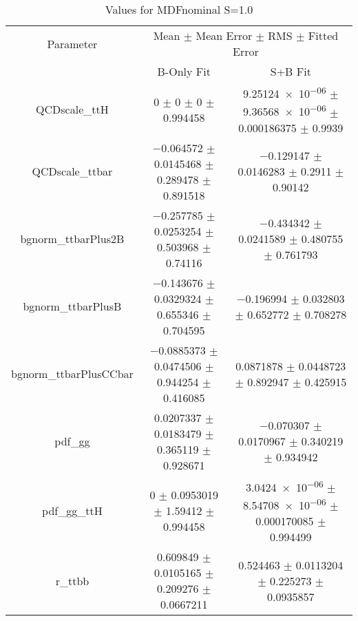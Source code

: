 \begin{table}
\centering
\caption{Values for MDFnominal S=1.0}
\begin{tabular}{ccc}
\toprule
Parameter & \multicolumn{2}{c}{Mean $\pm$ Mean Error $\pm$ RMS $\pm$ Fitted Error}\\
 & B-Only Fit & S+B Fit\\
\midrule
QCDscale\_ttH & \num{0} $\pm$ \num{0} $\pm$ \num{0} $\pm$ \num{0.994458} & \num{9.25124e-06} $\pm$ \num{9.36568e-06} $\pm$ \num{0.000186375} $\pm$ \num{0.9939}\\
QCDscale\_ttbar & \num{-0.064572} $\pm$ \num{0.0145468} $\pm$ \num{0.289478} $\pm$ \num{0.891518} & \num{-0.129147} $\pm$ \num{0.0146283} $\pm$ \num{0.2911} $\pm$ \num{0.90142}\\
bgnorm\_ttbarPlus2B & \num{-0.257785} $\pm$ \num{0.0253254} $\pm$ \num{0.503968} $\pm$ \num{0.74116} & \num{-0.434342} $\pm$ \num{0.0241589} $\pm$ \num{0.480755} $\pm$ \num{0.761793}\\
bgnorm\_ttbarPlusB & \num{-0.143676} $\pm$ \num{0.0329324} $\pm$ \num{0.655346} $\pm$ \num{0.704595} & \num{-0.196994} $\pm$ \num{0.032803} $\pm$ \num{0.652772} $\pm$ \num{0.708278}\\
bgnorm\_ttbarPlusCCbar & \num{-0.0885373} $\pm$ \num{0.0474506} $\pm$ \num{0.944254} $\pm$ \num{0.416085} & \num{0.0871878} $\pm$ \num{0.0448723} $\pm$ \num{0.892947} $\pm$ \num{0.425915}\\
pdf\_gg & \num{0.0207337} $\pm$ \num{0.0183479} $\pm$ \num{0.365119} $\pm$ \num{0.928671} & \num{-0.070307} $\pm$ \num{0.0170967} $\pm$ \num{0.340219} $\pm$ \num{0.934942}\\
pdf\_gg\_ttH & \num{0} $\pm$ \num{0.0953019} $\pm$ \num{1.59412} $\pm$ \num{0.994458} & \num{3.0424e-06} $\pm$ \num{8.54708e-06} $\pm$ \num{0.000170085} $\pm$ \num{0.994499}\\
r\_ttbb & \num{0.609849} $\pm$ \num{0.0105165} $\pm$ \num{0.209276} $\pm$ \num{0.0667211} & \num{0.524463} $\pm$ \num{0.0113204} $\pm$ \num{0.225273} $\pm$ \num{0.0935857}\\
\bottomrule
\end{tabular}
\end{table}